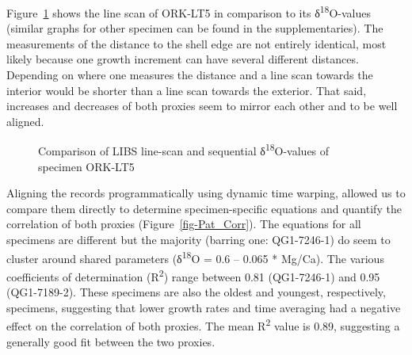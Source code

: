 \documentclass[
  authoryear,
  preprint,
  3p]{elsarticle}
\begin{document}
Figure~\ref{fig-Pat_Comp} shows the line scan of ORK-LT5 in comparison
to its δ\textsuperscript{18}O-values (similar graphs for other specimen
can be found in the supplementaries). The measurements of the distance
to the shell edge are not entirely identical, most likely because one
growth increment can have several different distances. Depending on
where one measures the distance and a line scan towards the interior
would be shorter than a line scan towards the exterior. That said,
increases and decreases of both proxies seem to mirror each other and to
be well aligned.

\begin{figure}


\caption{\label{fig-Pat_Comp}Comparison of LIBS line-scan and sequential
δ\textsuperscript{18}O-values of specimen ORK-LT5}

\end{figure}%

Aligning the records programmatically using dynamic time warping,
allowed us to compare them directly to determine specimen-specific
equations and quantify the correlation of both proxies
(Figure~\ref{fig-Pat_Corr}). The equations for all specimens are
different but the majority (barring one: QG1-7246-1) do seem to cluster
around shared parameters (δ\textsuperscript{18}Ο = 0.6 -- 0.065 *
Mg/Ca). The various coefficients of determination (R\textsuperscript{2})
range between 0.81 (QG1-7246-1) and 0.95 (QG1-7189-2). These specimens
are also the oldest and youngest, respectively, specimens, suggesting
that lower growth rates and time averaging had a negative effect on the
correlation of both proxies. The mean R\textsuperscript{2} value is
0.89, suggesting a generally good fit between the two proxies.
\end{document}
